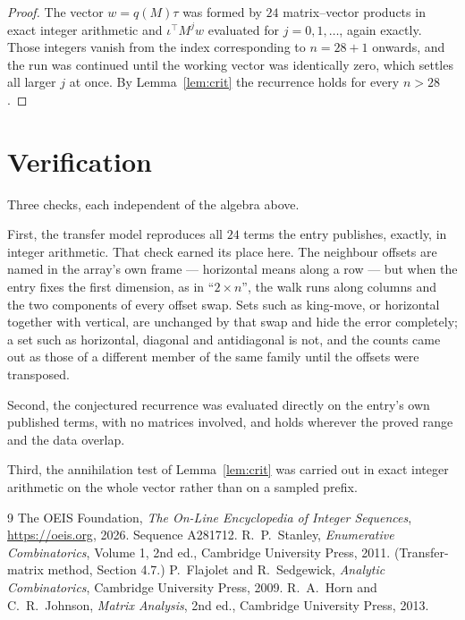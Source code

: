 \documentclass[11pt,a4paper]{article}
\theoremstyle{plain}
\theoremstyle{definition}
\begin{document}
\begin{proof}
The vector $w=q(M)\tau$ was formed by $24$ matrix--vector products in exact integer
arithmetic and $\iota^{\!\top}M^{j}w$ evaluated for $j=0,1,\dots$, again exactly. Those
integers vanish from the index corresponding to $n=28+1$ onwards, and the run was
continued until the working vector was identically zero, which settles all larger $j$ at once.
By Lemma~\ref{lem:crit} the recurrence holds for every $n>28$.
\end{proof}

\section{Verification}

Three checks, each independent of the algebra above.

First, the transfer model reproduces all $24$ terms the entry publishes, exactly, in
integer arithmetic. That check earned its place here. The neighbour offsets are named in the
array's own frame --- horizontal means along a row --- but when the entry fixes the first
dimension, as in ``$2\times n$'', the walk runs along columns and the two components of every
offset swap. Sets such as king-move, or horizontal together with vertical, are unchanged by
that swap and hide the error completely; a set such as horizontal, diagonal and antidiagonal
is not, and the counts came out as those of a different member of the same family until the
offsets were transposed.

Second, the conjectured recurrence was evaluated directly on the entry's own published terms,
with no matrices involved, and holds wherever the proved range and the data overlap.

Third, the annihilation test of Lemma~\ref{lem:crit} was carried out in exact integer
arithmetic on the whole vector rather than on a sampled prefix.

\begin{thebibliography}{9}
 The OEIS Foundation, \emph{The On-Line Encyclopedia of Integer
Sequences}, \url{https://oeis.org}, 2026. Sequence A281712.
 R.~P.~Stanley, \emph{Enumerative Combinatorics}, Volume 1, 2nd ed.,
Cambridge University Press, 2011. (Transfer-matrix method, Section 4.7.)
 P.~Flajolet and R.~Sedgewick, \emph{Analytic Combinatorics}, Cambridge
University Press, 2009.
 R.~A.~Horn and C.~R.~Johnson, \emph{Matrix Analysis}, 2nd ed., Cambridge
University Press, 2013.
\end{thebibliography}
\end{document}
